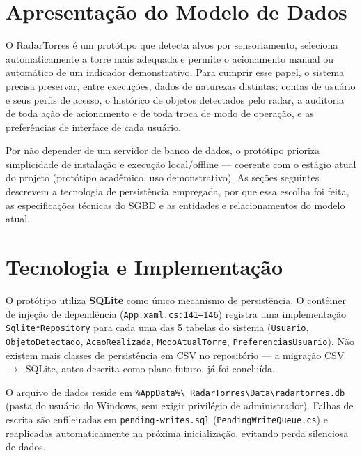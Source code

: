%

\section{Apresentação do Modelo de Dados}

O RadarTorres é um protótipo que detecta alvos por sensoriamento, seleciona automaticamente a
torre mais adequada e permite o acionamento manual ou automático de um indicador demonstrativo.
Para cumprir esse papel, o sistema precisa preservar, entre execuções, dados de naturezas
distintas: contas de usuário e seus perfis de acesso, o histórico de objetos detectados pelo
radar, a auditoria de toda ação de acionamento e de toda troca de modo de operação, e as
preferências de interface de cada usuário.

Por não depender de um servidor de banco de dados, o protótipo prioriza simplicidade de
instalação e execução local/offline — coerente com o estágio atual do projeto (protótipo
acadêmico, uso demonstrativo). As seções seguintes descrevem a tecnologia de persistência
empregada, por que essa escolha foi feita, as especificações técnicas do SGBD e as entidades
e relacionamentos do modelo atual.

\section{Tecnologia e Implementação}

O protótipo utiliza \textbf{SQLite} como único mecanismo de persistência. O contêiner de injeção
de dependência (\texttt{App.xaml.cs:141--146}) registra uma implementação \texttt{Sqlite*Repository}
para cada uma das 5 tabelas do sistema (\texttt{Usuario}, \texttt{ObjetoDetectado},
\texttt{AcaoRealizada}, \texttt{ModoAtualTorre}, \texttt{PreferenciasUsuario}). Não existem mais
classes de persistência em CSV no repositório — a migração CSV~$\rightarrow$~SQLite, antes
descrita como plano futuro, já foi concluída.

O arquivo de dados reside em \texttt{\%AppData\%}\allowbreak\texttt{\textbackslash
RadarTorres}\allowbreak\texttt{\textbackslash Data\textbackslash radartorres.db} (pasta do
usuário do Windows, sem exigir privilégio de administrador). Falhas de escrita são enfileiradas
em \texttt{pending-writes.sql} (\texttt{PendingWriteQueue.cs}) e reaplicadas automaticamente na
próxima inicialização, evitando perda silenciosa de dados.

